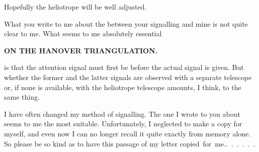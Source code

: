 Hopefully the  heliotrope will be well adjusted.
\par\noindent\hspace*{\parindent}What you write to me about the  between your signalling and mine is not quite clear to me.
What seems to me absolutely essential
\par\clearpage
\noindent\null\hfill{\small\textbf{ON THE HANOVER TRIANGULATION.}}\hfill{}\par\medskip
\noindent is that the attention signal must first be  before the actual signal is given. But whether the former and the latter signals are observed with a separate telescope or, if none is available, with the heliotrope telescope amounts, I think, to the same thing.
\par\noindent\hspace*{\parindent}I have often changed my method of signalling. The one I wrote to you about seems to me the most suitable.
Unfortunately, I neglected to make a copy for myself, and even now I can no longer recall it quite exactly from memory alone.
So please be so kind as to have this passage of my letter \mbox{copied for me.\quad.\ .\ .\ .\ .\ .}
\par
\endgroup
